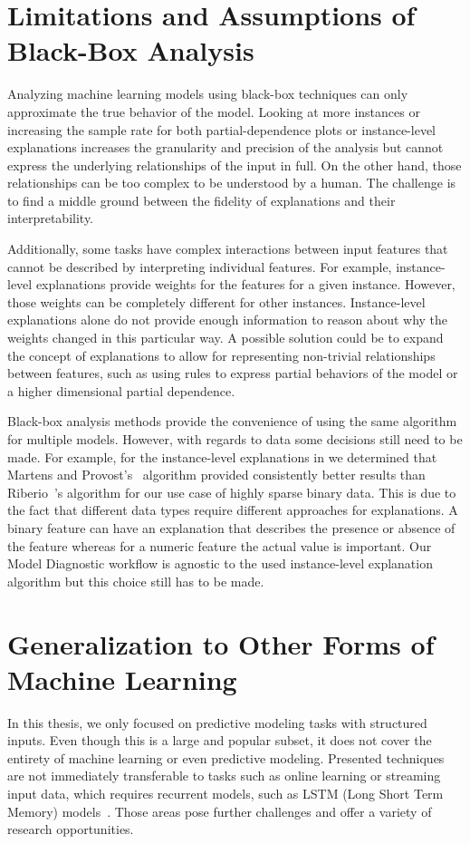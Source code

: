 \section{Limitations and Assumptions of Black-Box Analysis}
Analyzing machine learning models using black-box techniques can only approximate the true behavior of the model.
Looking at more instances or increasing the sample rate for both partial-dependence plots or instance-level explanations increases the granularity and precision of the analysis but cannot express the underlying relationships of the input in full.
On the other hand, those relationships can be too complex to be understood by a human.
The challenge is to find a middle ground between the fidelity of explanations and their interpretability.

Additionally, some tasks have complex interactions between input features that cannot be described by interpreting individual features.
For example, instance-level explanations provide weights for the features for a given instance.
However, those weights can be completely different for other instances.
Instance-level explanations alone do not provide enough information to reason about why the weights changed in this particular way.
A possible solution could be to expand the concept of explanations to allow for representing non-trivial relationships between features, such as using rules to express partial behaviors of the model or a higher dimensional partial dependence.

Black-box analysis methods provide the convenience of using the same algorithm for multiple models.
However, with regards to data some decisions still need to be made.
For example, for the instance-level explanations in  we determined that Martens and Provost's~\cite{Martens:2014:EDD:2600518.2600523} algorithm provided consistently better results than Riberio~\etal's\cite{DBLP:journals/corr/RibeiroSG16} algorithm for our use case of highly sparse binary data.
This is due to the fact that different data types require different approaches for explanations.
A binary feature can have an explanation that describes the presence or absence of the feature whereas for a numeric feature the actual value is important.
Our Model Diagnostic workflow is agnostic to the used instance-level explanation algorithm but this choice still has to be made.

\section{Generalization to Other Forms of Machine Learning}
In this thesis, we only focused on predictive modeling tasks with structured inputs.
Even though this is a large and popular subset, it does not cover the entirety of machine learning or even predictive modeling.
Presented techniques are not immediately transferable to tasks such as online learning or streaming input data, which requires recurrent models, such as LSTM (Long Short Term Memory) models~\cite{Hochreiter:1997:LSM:1246443.1246450}.
Those areas pose further challenges and offer a variety of research opportunities.

